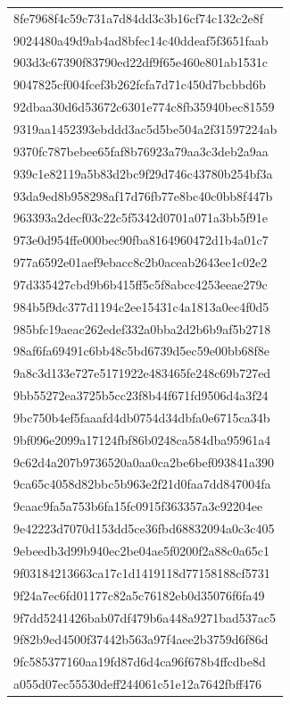 \begin{tabular}{l}
8fe7968f4c59c731a7d84dd3c3b16cf74c132c2e8f \\
9024480a49d9ab4ad8bfec14c40ddeaf5f3651faab \\
903d3c67390f83790ed22df9f65e460e801ab1531c \\
9047825cf004fcef3b262fcfa7d71c450d7bcbbd6b \\
92dbaa30d6d53672c6301e774c8fb35940bec81559 \\
9319aa1452393ebddd3ac5d5be504a2f31597224ab \\
9370fc787bebee65faf8b76923a79aa3c3deb2a9aa \\
939c1e82119a5b83d2bc9f29d746c43780b254bf3a \\
93da9ed8b958298af17d76fb77e8bc40c0bb8f447b \\
963393a2decf03c22c5f5342d0701a071a3bb5f91e \\
973e0d954ffe000bec90fba8164960472d1b4a01c7 \\
977a6592e01aef9ebacc8c2b0aceab2643ee1c02e2 \\
97d335427cbd9b6b415ff5c5f8abcc4253eeae279c \\
984b5f9dc377d1194c2ee15431c4a1813a0ec4f0d5 \\
985bfc19aeac262edef332a0bba2d2b6b9af5b2718 \\
98af6fa69491c6bb48c5bd6739d5ec59e00bb68f8e \\
9a8c3d133e727e5171922e483465fe248c69b727ed \\
9bb55272ea3725b5cc23f8b44f671fd9506d4a3f24 \\
9bc750b4ef5faaafd4db0754d34dbfa0e6715ca34b \\
9bf096e2099a17124fbf86b0248ca584dba95961a4 \\
9c62d4a207b9736520a0aa0ca2be6bef093841a390 \\
9ca65c4058d82bbc5b963e2f21d0faa7dd847004fa \\
9caac9fa5a753b6fa15fc0915f363357a3c92204ee \\
9e42223d7070d153dd5ce36fbd68832094a0c3c405 \\
9ebeedb3d99b940ec2be04ae5f0200f2a88c0a65c1 \\
9f03184213663ca17c1d1419118d77158188cf5731 \\
9f24a7ec6fd01177c82a5c76182eb0d35076f6fa49 \\
9f7dd5241426bab07df479b6a448a9271bad537ac5 \\
9f82b9ed4500f37442b563a97f4aee2b3759d6f86d \\
9fc585377160aa19fd87d6d4ca96f678b4ffcdbe8d \\
a055d07ec55530deff244061c51e12a7642fbff476 \\

\end{tabular}
